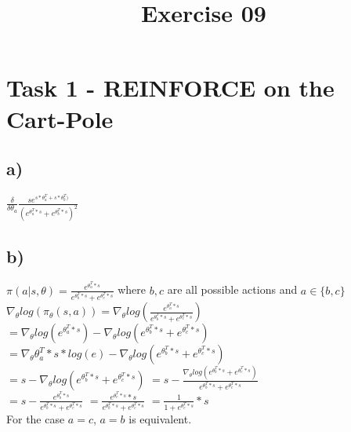 \documentclass[a4paper]{article}
\date{}
\author{}
\title{\textbf{Exercise 09}}
\begin{document}
	\maketitle 
	\thispagestyle{fancy}
	
    \section*{Task 1 - REINFORCE on the Cart-Pole}
    \subsection*{a)}
    $\frac{\delta}{\delta \theta_a}\frac{se^{s*\theta_a^T+s*\theta_b^T)}}{(e^{\theta_a^T*s}+e^{\theta_b^T*s})^2}$
 	\subsection*{b)}
 	$\pi(a|s,\theta) = \frac{e^{\theta_a^T*s}}{e^{\theta_b^T*s}+e^{\theta_c^T*s}}$ where $b,c$ are all possible actions and $a \in \{b,c\}$ \\
 	$\nabla_\theta log(\pi_\theta(s,a)) = \nabla_\theta log(\frac{e^{\theta_a^T*s}}{e^{\theta_b^T*s}+e^{\theta_c^T*s}})$ \\
 	$= \nabla_\theta log(e^{\theta_a^T*s})-\nabla_\theta log(e^{\theta_b^T*s}+e^{\theta_c^T*s})$ \\
 	$= \nabla_\theta \theta_a^T*s*log(e)-\nabla_\theta log(e^{\theta_b^T*s}+e^{\theta_c^T*s})$ \\
 	$= s -\nabla_\theta log(e^{\theta_b^T*s}+e^{\theta_c^T*s})$
 	$= s -\frac{\nabla_\theta log(e^{\theta_b^T*s}+e^{\theta_c^T*s})}{e^{\theta_b^T*s}+e^{\theta_c^T*s}}$ \\
 	$= s - \frac{e^{\theta_b^T*s}}{e^{\theta_b^T*s}+e^{\theta_c^T*s}}$ 
 	$= \frac{e^{\theta_c^T*s}*s}{e^{\theta_b^T*s}+e^{\theta_c^T*s}}$
 	$= \frac{1}{1+e^{\theta_c^T*s}}*s$ \\
 	For the case $a=c$, $a=b$ is equivalent.
\end{document}
